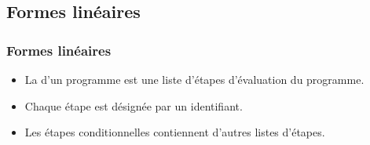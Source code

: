 \subsection{Formes linéaires}

\begin{frame}[fragile,t]
    \frametitle{Formes linéaires}

    \begin{itemize}
        \item La  d'un programme est une liste
              d'étapes d'évaluation du programme.
        \item Chaque étape est désignée par un identifiant.

        \item Les étapes conditionnelles contiennent d'autres listes
              d'étapes.
    \end{itemize}
\end{frame}

